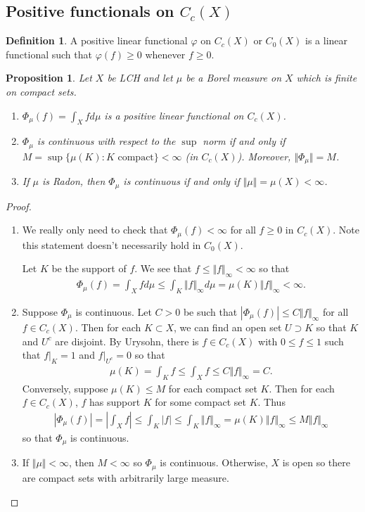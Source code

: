 \documentclass[11pt]{amsart}
\newtheorem{proposition}[theorem]{Proposition}
\theoremstyle{definition}
\newtheorem{definition}[theorem]{Definition}
\numberwithin{equation}{section}
\begin{document}
\subsection{Positive functionals on \texorpdfstring{$C_c(X)$}{Cc(X)}}
\begin{definition}
    A positive linear functional $\varphi $ on $C_c(X)$ or $C_0(X)$ is a linear functional such that $\varphi(f)\ge 0$ whenever $f\ge 0$.
\end{definition}
\begin{proposition}
    Let $X$ be LCH and let $\mu$ be a Borel measure on $X$ which is finite on compact sets.
    \begin{enumerate}
        \item [(i)] $\Phi_\mu(f)=\int_X fd\mu$ is a positive linear functional on $C_c(X)$.
        \item [(ii)] $\Phi_\mu$ is continuous with respect to the $\sup$ norm if and only if $M=\sup\{\mu(K):K\text{ compact}\}<\infty$ (in $C_c(X)$). Moreover, $\Vert\Phi_\mu\Vert=M$.
        \item [(iii)] If $\mu$ is Radon, then $\Phi_\mu$ is continuous if and only if $\Vert\mu\Vert=\mu(X)<\infty$.
    \end{enumerate}
\end{proposition}
\begin{proof}
    \begin{enumerate}
        \item [(i)] We really only need to check that $\Phi_\mu(f)<\infty$ for all $f\ge 0$ in $C_c(X)$. Note this statement doesn't necessarily hold in $C_0(X)$.

        Let $K$ be the support of $f$. We see that $f\le\Vert f\Vert_\infty<\infty$ so that 
        \begin{align*}
            \Phi_\mu(f)=\int_X fd\mu\le\int_K\Vert f\Vert_\infty d\mu=\mu(K)\Vert f\Vert_\infty<\infty.
        \end{align*}
        \item [(ii)] Suppose $\Phi_\mu$ is continuous. Let $C>0$ be such that $|\Phi_\mu(f)|\le C\Vert f\Vert_\infty$ for all $f\in C_c(X)$. Then for each $K\subset X$, we can find an open set $U\supset K$ so that $K$ and $U^c$ are disjoint. By Urysohn, there is $f\in C_c(X)$ with $0\le f\le 1$ such that $f|_K=1$ and $f|_{U^c}=0$ so that 
        \begin{align*}
            \mu(K)=\int_Kf\le\int_Xf\le C\Vert f\Vert_\infty=C.
        \end{align*}
        Conversely, suppose $\mu(K)\le M$ for each compact set $K$. Then for each $f\in C_c(X)$, $f$ has support $K$ for some compact set $K$. Thus
        \begin{align*}
            \left|\Phi_\mu(f)\right|=\left|\int_Xf\right|\le\int_K|f|\le\int_K\Vert f\Vert_\infty=\mu(K)\Vert f\Vert_\infty\le M\Vert f\Vert_\infty
        \end{align*}
        so that $\Phi_\mu$ is continuous.
        \item [(iii)] If $\Vert\mu\Vert<\infty$, then $M<\infty$ so $\Phi_\mu$ is continuous. Otherwise, $X$ is open so there are compact sets with arbitrarily large measure.
    \end{enumerate}
\end{proof}
\end{document}
